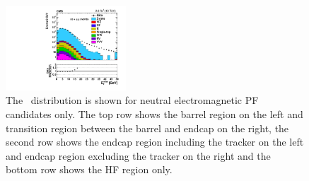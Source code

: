 \begin{figure}[!ht]
\begin{center}
\begin{tabular}{cc}
\end{tabular}
\includegraphics[width=0.4\textwidth]{MET/figs/h_met_phpfcands_30in_pt_ll_signalregion_inclusive_passtrig.pdf} 
\caption{The \MET\ distribution is shown for neutral electromagnetic PF candidates only.
The top row shows the barrel region on the left and transition region between the barrel and endcap on the right,
the second row shows the endcap region including the tracker on the left and endcap region excluding the tracker on the right
and the bottom row shows the HF region only.
\label{fig:phpfcands}
}
\end{center}
\end{figure}

